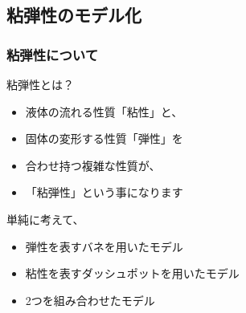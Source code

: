 \documentclass[unicode,12pt]{beamer}%
\begin{document}
\subsection{粘弾性のモデル化}
\begin{frame}
	\frametitle{粘弾性について}
		\begin{block}{粘弾性とは？}
			\begin{itemize}
				\item 液体の流れる性質「粘性」と、
				\item 固体の変形する性質「弾性」を
				\item 合わせ持つ複雑な性質が、
				\item 「粘弾性」という事になります
			\end{itemize}
		\end{block}
		\begin{exampleblock}{単純に考えて、}
			\begin{itemize}
				\item 弾性を表すバネを用いたモデル
				\item 粘性を表すダッシュポットを用いたモデル
				\item 2つを組み合わせたモデル
			\end{itemize}
		\end{exampleblock}
\end{frame}
\end{document}
